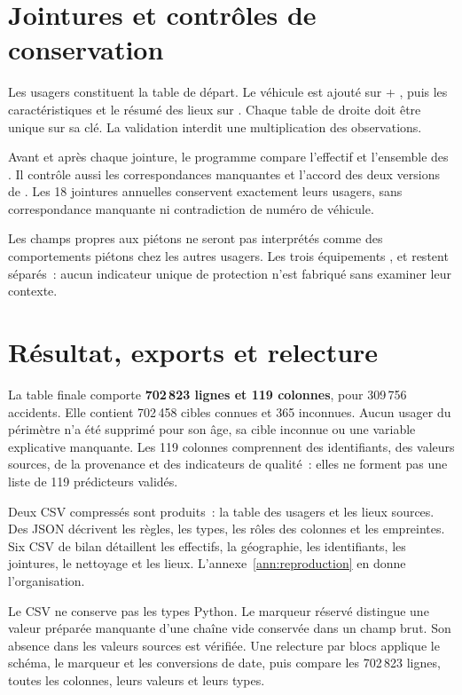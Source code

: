 \section{Jointures et contrôles de conservation}
Les usagers constituent la table de départ. Le véhicule est ajouté sur
 + , puis les caractéristiques et le résumé des lieux sur
. Chaque table de droite doit être unique sur sa clé. La validation
 interdit une multiplication des observations.

Avant et après chaque jointure, le programme compare l'effectif et l'ensemble des
. Il contrôle aussi les correspondances manquantes et l'accord des
deux versions de . Les 18 jointures annuelles conservent exactement leurs
usagers, sans correspondance manquante ni contradiction de numéro de véhicule.

Les champs propres aux piétons ne seront pas interprétés comme des comportements
piétons chez les autres usagers. Les trois équipements ,  et
 restent séparés~: aucun indicateur unique de protection n'est fabriqué
sans examiner leur contexte.

\section{Résultat, exports et relecture}
La table finale comporte \textbf{702\,823 lignes et 119 colonnes}, pour 309\,756 accidents.
Elle contient 702\,458 cibles connues et 365 inconnues. Aucun usager du périmètre n'a
été supprimé pour son âge, sa cible inconnue ou une variable explicative manquante.
Les 119 colonnes comprennent des identifiants, des valeurs sources, de la provenance
et des indicateurs de qualité~: elles ne forment pas une liste de 119 prédicteurs validés.

Deux CSV compressés sont produits~: la table des usagers et les lieux sources. Des JSON
décrivent les règles, les types, les rôles des colonnes et les empreintes. Six CSV de
bilan détaillent les effectifs, la géographie, les identifiants, les jointures, le
nettoyage et les lieux. L'annexe~\ref{ann:reproduction} en donne l'organisation.

Le CSV ne conserve pas les types Python. Le marqueur réservé
 distingue une valeur préparée manquante d'une chaîne vide
conservée dans un champ brut. Son absence dans les valeurs sources est vérifiée.
Une relecture par blocs applique le schéma, le marqueur et les conversions de date,
puis compare les 702\,823 lignes, toutes les colonnes, leurs valeurs et leurs types.

\FloatBarrier
{}
